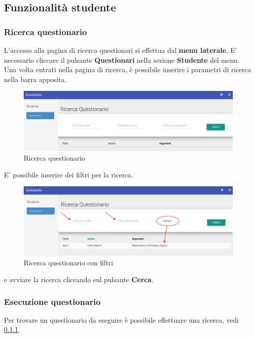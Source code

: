 \documentclass[12pt,a4paper]{article}
\begin{document}
	\subsection{Funzionalità studente}
	\subsubsection{Ricerca questionario}\label{ricerca_questionario}
	L'accesso alla pagina di ricerca questionari si effettua dal \textbf{menu laterale}. 
	E' necessario cliccare il pulsante \textbf{Questionari} nella sezione \textbf{Studente} del menu.
	Una volta entrati nella pagina di ricerca, è possibile inserire i parametri di ricerca nella barra apposita.
	
	\begin{figure}[H]	
		\centering
		\includegraphics[width=1.0\linewidth]{../img/screenshot/ricercaQuestionario.png}
		\caption{Ricerca questionario}
		\label{Ricerca questionario}
	\end{figure}
	
	E' possibile inserire dei filtri per la ricerca. 
	
	\begin{figure}[H]		
		\centering
		\includegraphics[width=1.0\linewidth]{../img/screenshot/filtriRicerca.png}
		\caption{Ricerca questionario con filtri}
		\label{Ricerca questionario con filtri}
	\end{figure}
	
	e avviare la ricerca cliccando sul pulsante \textbf{Cerca}.
	
	
	\subsubsection{Esecuzione questionario}
	Per trovare un questionario da eseguire è possibile effettuare una ricerca, vedi \ref{ricerca_questionario}.
\end{document}
